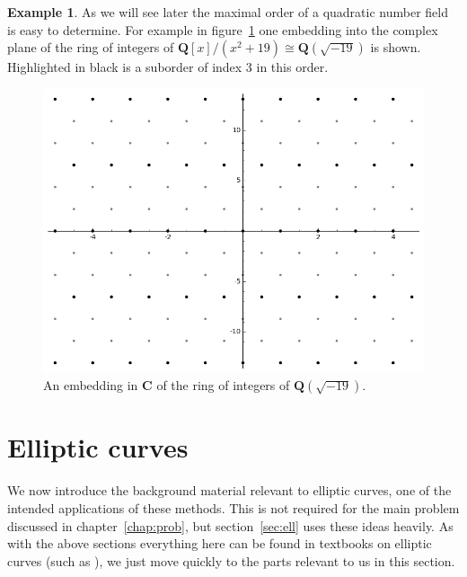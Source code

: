 \documentclass[a4paper,abstracton,bibtotoc]{scrreprt}
\theoremstyle{definition}
\newtheorem{ex}{Example}
\newcommand{\QQ}{\mathbf{Q}}
\newcommand{\CC}{\mathbf{C}}
\begin{document}
\begin{ex}
As we will see later the maximal order of a quadratic number field is easy to determine.
For example in figure~\ref{fig:sageord} one embedding into the complex plane of the ring of integers of $\QQ[x]/(x^2 + 19)\cong \QQ(\sqrt{-19})$ is shown.
Highlighted in black is a suborder of index 3 in this order.
\begin{figure}
\centering
\includegraphics[scale=0.6]{sageord}
\caption{\label{fig:sageord} An embedding in $\CC$ of the ring of integers of $\QQ(\sqrt{-19})$.}
\end{figure}
\end{ex}

%

\section{Elliptic curves}
We now introduce the background material relevant to elliptic curves, one of the intended applications of these methods.
This is not required for the main problem discussed in chapter~\ref{chap:prob}, but section~\ref{sec:ell} uses these ideas heavily.
As with the above sections everything here can be found in textbooks on elliptic curves (such as \cite{knapp}), we just move quickly to the parts relevant to us in this section.
\end{document}
